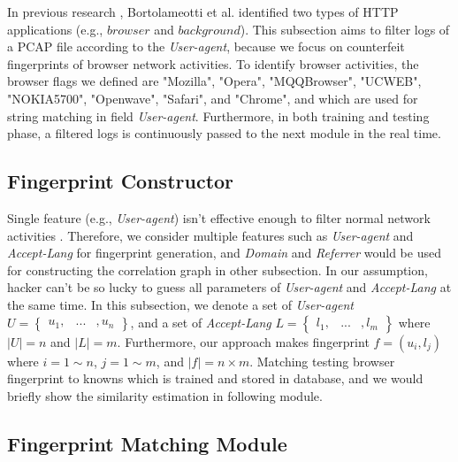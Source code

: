 In previous research \cite{bortolameotti2017decanter}, Bortolameotti et al. identified two types of HTTP applications (e.g., $browser$ and $background$). This subsection aims to filter logs of a PCAP file according to the {\em User-agent}, because we focus on counterfeit fingerprints of browser network activities. To identify browser activities, the browser flags we defined are "Mozilla", "Opera", "MQQBrowser", "UCWEB",  "NOKIA5700", "Openwave", "Safari", and "Chrome", and which are used for string matching in field {\em User-agent}. Furthermore, in both training and testing phase, a filtered logs is continuously passed to the next module in the real time.


\subsection{Fingerprint Constructor}

Single feature (e.g., {\em User-agent}) isn't effective enough to filter normal network activities \cite{bortolameotti2017decanter} \cite{kheir2013analyzing}. Therefore, we consider multiple features such as {\em User-agent} and {\em Accept-Lang} for fingerprint generation, and {\em Domain} and {\em Referrer} would be used for constructing the correlation graph in other subsection. In our assumption, hacker can't be so lucky to guess all parameters of {\em User-agent} and {\em Accept-Lang} at the same time. In this subsection, we denote a set of {\em User-agent} $U = \begin{Bmatrix} u_{1}, & ... & , u_{n} \end{Bmatrix}$, and a set of {\em Accept-Lang} $L = \begin{Bmatrix} l_{1}, & ... & , l_{m} \end{Bmatrix}$ where $\left | U \right | = n$ and $\left | L  \right | = m$. Furthermore, our approach makes fingerprint $f = (u_{i}, l_{j})$ where $i = 1 \sim n$, $j = 1 \sim m$, and $\left | f \right | = n \times m $. Matching testing browser fingerprint to knowns which is trained and stored in database, and we would briefly show the similarity estimation in following module.

\subsection{Fingerprint Matching Module}

